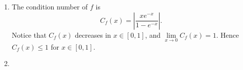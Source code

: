 \documentclass[11pt]{elegantbook}
\begin{document}
\begin{solution}
  \begin{enumerate}[(1)]
    \item The condition number of $f$ is
    \begin{equation*}
      C_f(x)=\left|\frac{xe^{-x}}{1-e^{-x}}\right|.
    \end{equation*}
    Notice that $C_f(x)$ decreases in $x\in[0,1]$, and $\lim\limits_{x\to 0} C_f(x)=1$. Hence $C_f(x)\leq 1$ for $x\in[0,1]$.
    \item 
  \end{enumerate}
\end{solution}
\end{document}
